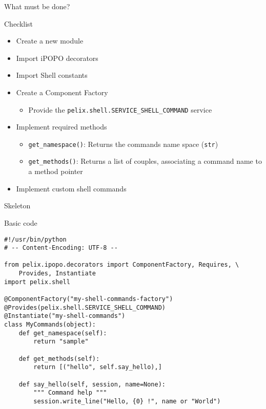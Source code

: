 \begin{frame}{What must be done?}
\begin{block}{Checklist}
\begin{itemize}
\item Create a new module
\item Import iPOPO decorators
\item Import Shell constants
\item Create a Component Factory
\begin{itemize}
\item Provide the \texttt{pelix.shell.SERVICE\_SHELL\_COMMAND} service
\end{itemize}
\item Implement required methods
\begin{itemize}
\item \texttt{get\_namespace()}: Returns the commands name space (\texttt{str})
\item \texttt{get\_methods()}: Returns a list of couples, associating a command name to a method pointer
\end{itemize}
\item Implement custom shell commands
\end{itemize}
\end{block}
\end{frame}

\begin{frame}[fragile]{Skeleton}
\begin{scriptsize}
\begin{block}{Basic code}
\begin{verbatim}
#!/usr/bin/python
# -- Content-Encoding: UTF-8 --

from pelix.ipopo.decorators import ComponentFactory, Requires, \
    Provides, Instantiate
import pelix.shell

@ComponentFactory("my-shell-commands-factory")
@Provides(pelix.shell.SERVICE_SHELL_COMMAND)
@Instantiate("my-shell-commands")
class MyCommands(object):
    def get_namespace(self):
        return "sample"

    def get_methods(self):
        return [("hello", self.say_hello),]

    def say_hello(self, session, name=None):
        """ Command help """
        session.write_line("Hello, {0} !", name or "World")
\end{verbatim}
\end{block}
\end{scriptsize}
\end{frame}
